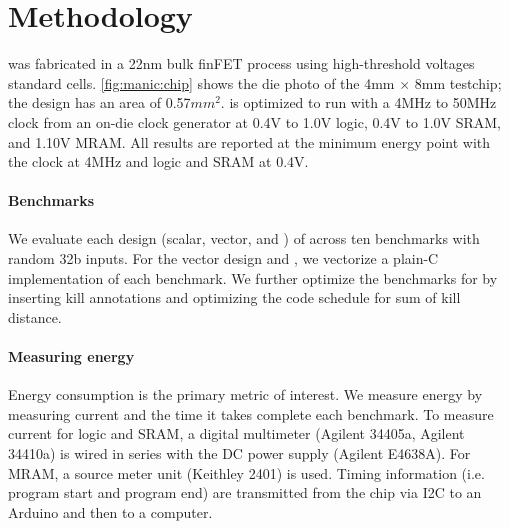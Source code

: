 \section{Methodology}
\label{manic:method}
\figMANICChip
\msilicon was fabricated in a 22nm bulk finFET process using high-threshold voltages standard cells.
%
\autoref{fig:manic:chip} shows the die photo of the 4mm $\times$ 8mm testchip; the \manic design has an area of 0.57$mm^2$.
%
\msilicon is optimized to run with a 4MHz to 50MHz clock from an on-die clock generator at 0.4V to 1.0V logic, 0.4V to 1.0V SRAM, and 1.10V MRAM.
% 
All results are reported at the minimum energy point with the clock at 4MHz and logic and SRAM at 0.4V.

\paragraph{Benchmarks}
We evaluate each design (scalar, vector, and \manic) of \msilicon across ten benchmarks with random 32b inputs.
% 
For the vector design and \manic, we vectorize a plain-C implementation of each benchmark.
% 
We further optimize the benchmarks for \manic by inserting kill annotations and optimizing the code schedule for sum of kill distance.

\paragraph{Measuring energy}
Energy consumption is the primary metric of interest.
% 
We measure energy by measuring current and the time it takes complete each benchmark.
% 
To measure current for logic and SRAM, a digital multimeter (Agilent 34405a, Agilent 34410a) is wired in series with the DC power supply (Agilent E4638A). 
% 
For MRAM, a source meter unit (Keithley 2401) is used. 
% 
Timing information (i.e. program start and program end) are transmitted from the chip via I2C to an Arduino and then to a computer.